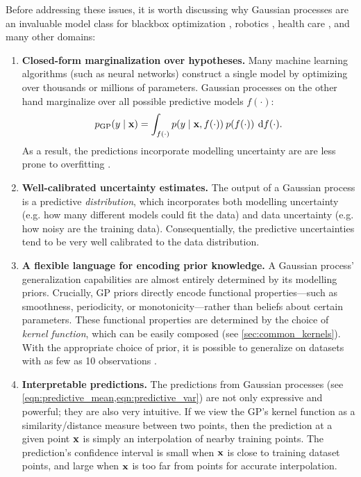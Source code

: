 Before addressing these issues, it is worth discussing why Gaussian processes are an invaluable model class for blackbox optimization \citep[e.g.][]{snoek2012practical}, robotics \citep[e.g.][]{deisenroth2011pilco}, health care \citep[e.g.][]{schulam2015framework}, and many other domains:
\begin{enumerate}
  \item {\bf Closed-form marginalization over hypotheses.}
    Many machine learning algorithms (such as neural networks) construct a single model by optimizing over thousands or millions of parameters.
    Gaussian processes on the other hand marginalize over all possible predictive models $f(\cdot)$:
    \[
      p_\text{GP} ( y \mid \mathbf{x} ) = \int_{f(\cdot)} p( y \mid \mathbf{x}, f(\cdot)) \: p(f(\cdot)) \: \,\mathrm{d}{f}(\cdot).
    \]
    As a result, the predictions incorporate modelling uncertainty are are less prone to overfitting \cite{rasmussen2006gaussian}.

  \item {\bf Well-calibrated uncertainty estimates.}
    The output of a Gaussian process is a predictive \emph{distribution}, which incorporates both modelling uncertainty (e.g. how many different models could fit the data) and data uncertainty (e.g. how noisy are the training data).
    Consequentially, the predictive uncertainties tend to be very well calibrated to the data distribution.

  \item {\bf A flexible language for encoding prior knowledge.}
    A Gaussian process' generalization capabilities are almost entirely determined by its modelling priors.
    Crucially, GP priors directly encode functional properties---such as smoothness, periodicity, or monotonicity---rather than beliefs about certain parameters.
    These functional properties are determined by the choice of \emph{kernel function}, which can be easily composed (see \cref{sec:common_kernels}).
    With the appropriate choice of prior, it is possible to generalize on datasets with as few as 10 observations \citep[e.g.][]{rasmussen2006gaussian,gardner2017discovering}.

  \item {\bf Interpretable predictions.}
    The predictions from Gaussian processes (see \cref{eqn:predictive_mean,eqn:predictive_var}) are not only expressive and powerful; they are also very intuitive.
    If we view the GP's kernel function as a similarity/distance measure between two points, then the prediction at a given point $\mathbf{x}$ is simply an interpolation of nearby training points.
    The prediction's confidence interval is small when $\mathbf{x}$ is close to training dataset points, and large when $\mathbf{x}$ is too far from points for accurate interpolation.
\end{enumerate}

